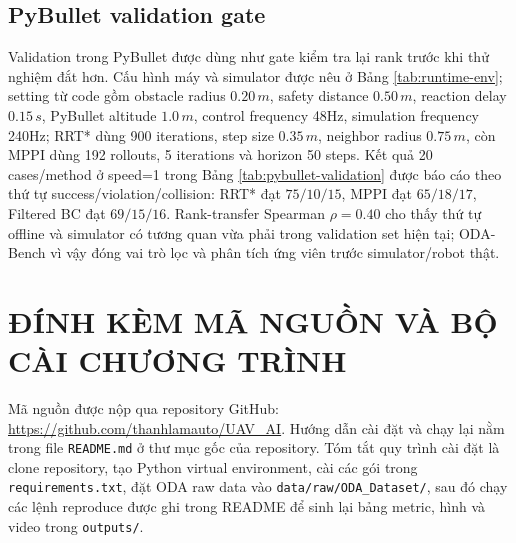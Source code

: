 \documentclass[10pt,letterpaper,twocolumn]{article}
\newcommand{\pathcode}[1]{\nolinkurl{#1}}
\begin{document}
\subsection{PyBullet validation gate}
Validation trong PyBullet được dùng như gate kiểm tra lại rank trước khi thử nghiệm đắt hơn. Cấu hình máy và simulator được nêu ở Bảng \ref{tab:runtime-env}; setting từ code gồm obstacle radius \(0.20\,m\), safety distance \(0.50\,m\), reaction delay \(0.15\,s\), PyBullet altitude \(1.0\,m\), control frequency 48Hz, simulation frequency 240Hz; RRT* dùng 900 iterations, step size \(0.35\,m\), neighbor radius \(0.75\,m\), còn MPPI dùng 192 rollouts, 5 iterations và horizon 50 steps. Kết quả 20 cases/method ở speed=1 trong Bảng \ref{tab:pybullet-validation} được báo cáo theo thứ tự success/violation/collision: RRT* đạt \(75/10/15\), MPPI đạt \(65/18/17\), Filtered BC đạt \(69/15/16\). Rank-transfer Spearman \(\rho=0.40\) cho thấy thứ tự offline và simulator có tương quan vừa phải trong validation set hiện tại; ODA-Bench vì vậy đóng vai trò lọc và phân tích ứng viên trước simulator/robot thật.

\begin{table}[!t]
\centering
\footnotesize
\caption{PyBullet validation, 20 cases/method, speed=1.}
\label{tab:pybullet-validation}
\end{table}

\section{ĐÍNH KÈM MÃ NGUỒN VÀ BỘ CÀI CHƯƠNG TRÌNH}
Mã nguồn được nộp qua repository GitHub: \url{https://github.com/thanhlamauto/UAV_AI}. Hướng dẫn cài đặt và chạy lại nằm trong file \pathcode{README.md} ở thư mục gốc của repository. Tóm tắt quy trình cài đặt là clone repository, tạo Python virtual environment, cài các gói trong \pathcode{requirements.txt}, đặt ODA raw data vào \pathcode{data/raw/ODA_Dataset/}, sau đó chạy các lệnh reproduce được ghi trong README để sinh lại bảng metric, hình và video trong \pathcode{outputs/}.
\end{document}
